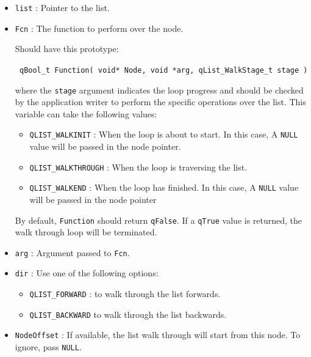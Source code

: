 \documentclass{article}
\begin{document}
\begin{itemize}
    \item \lstinline{list} : Pointer to the list.
    \item \lstinline{Fcn} : The function to perform over the node. 
                            
                            Should have this prototype:
                            
                            \lstinline{ qBool_t Function( void* Node, void *arg, qList_WalkStage_t stage ) }
                            
                            where the \lstinline{stage} argument indicates the loop progress and should be checked by the application writer to perform the specific operations over the list. This variable can take the following values:
                            
                            \begin{itemize}
                                \item \lstinline{QLIST_WALKINIT} : When the loop is about to start. In this case, A \lstinline{NULL} value will be passed in the node pointer.
                                \item \lstinline{QLIST_WALKTHROUGH} : When the loop is traversing the list.
                                \item \lstinline{QLIST_WALKEND} :  When the loop has finished. In this case, A \lstinline{NULL} value will be passed in the node pointer
                            \end{itemize}
                            
                            By default, \lstinline{Function} should return \lstinline{qFalse}. If a \lstinline{qTrue} value is returned, the walk through loop will be terminated.
    \item \lstinline{arg} : Argument passed to \lstinline{Fcn}.
    \item \lstinline{dir} : Use one of the following options:
                            \begin{itemize}
                                \item \lstinline{QLIST_FORWARD} : to walk through the list forwards.
                                \item \lstinline{QLIST_BACKWARD} to walk through the list backwards.
                            \end{itemize}
    \item \lstinline{NodeOffset} : If available, the list walk through will start from this node.  
                   To ignore, pass \lstinline{NULL}.
\end{itemize}
\end{document}
